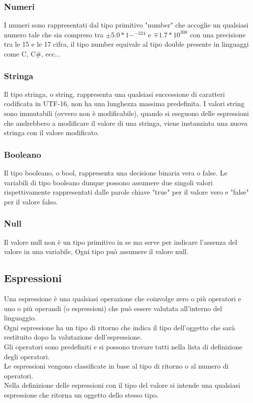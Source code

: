 \subsubsection{Numeri}
I numeri sono rappresentati dal tipo primitivo "number" che accoglie un qualsiasi numero tale che
sia compreso tra \( \pm5.0*1-^{-324} \) e \(\mp 1.7*10^308\) con una precisione tra le 15 e le 17
cifra, il tipo number equivale al tipo double presente in linguaggi come C, C\#, ecc...

\subsubsection{Stringa}
Il tipo stringa, o string, rappresenta una qualsiasi successione di caratteri codificata in UTF-16, 
non ha una lunghezza massima predefinita.
I valori string sono immutabili (ovvero non è modificabile), quando si eseguono delle espressioni
che andrebbero a modificare il valore di una stringa, viene instanziata una nuova stringa con il valore
modificato.

\subsubsection{Booleano}
Il tipo booleano, o bool, rappresenta una decisione binaria vera o false.
Le variabili di tipo booleano dunque possono assumere due singoli valori rispettivamente 
rappresentati dalle parole chiave "true" per il valore vero e "false" per il valore falso.

\subsubsection{Null}
Il valore null non è un tipo primitivo in se ma serve per indicare l'assenza del valore in una variabile,
Ogni tipo può assumere il valore null.

\newpage
 
\subsection{Espressioni}
Una espressione è una qualsiasi operazione che coinvolge zero o più operatori e uno o più operandi 
(o espressioni) che può essere valutata all’interno del linguaggio. \\
Ogni espressione ha un tipo di ritorno che indica il tipo dell’oggetto che sarà restituito dopo la valutazione 
dell’espressione. \\
Gli operatori sono predefiniti e si possono trovare tutti nella lista di definizione degli operatori. \\
Le espressioni vengono classificate in base al tipo di ritorno o al numero di operatori.
\\
Nella definizione delle espressioni con il tipo del valore si intende una qualsiasi espressione che ritorna 
un oggetto dello stesso tipo.

